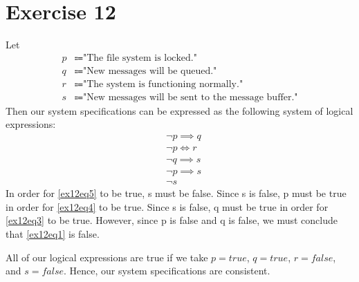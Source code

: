 \documentclass{article}
\begin{document}
\pagebreak

\section{Exercise 12}
Let
\begin{align*}
	p & \Coloneqq \text{"The file system is locked."}                       \\
	q & \Coloneqq \text{"New messages will be queued."}                     \\
	r & \Coloneqq \text{"The system is functioning normally."}              \\
	s & \Coloneqq \text{"New messages will be sent to the message buffer."}
\end{align*}
Then our system specifications can be expressed as the following system of logical expressions:
\begin{align}
	 & \neg p \implies q \label{ex12eq1} \\
	 & \neg p \iff r \label{ex12eq2}     \\
	 & \neg q \implies s \label{ex12eq3} \\
	 & \neg p \implies s \label{ex12eq4} \\
	 & \neg s \label{ex12eq5}
\end{align}
In order for \eqref{ex12eq5} to be true, s must be false. Since s is false, p must be true in order for \eqref{ex12eq4} to be true. Since s is false, q must be true in order for \eqref{ex12eq3} to be true. However, since p is false and q is false, we must conclude that \eqref{ex12eq1} is false.

All of our logical expressions are true if we take $p = true$, $q = true$, $r = false$, and $s = false$. Hence, our system specifications are consistent.
\end{document}
